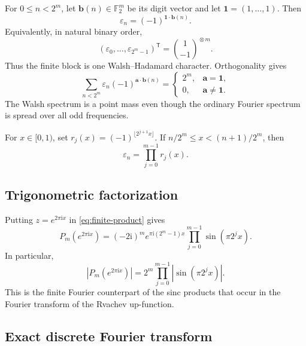 \documentclass[11pt,oneside]{article}
\numberwithin{equation}{section}
\theoremstyle{definition}
\theoremstyle{remark}
\newcommand{\F}{\mathbb F}
\newcommand{\eps}{\varepsilon}
\newcommand{\ii}{\mathrm i}
\begin{document}
For \(0\le n<2^m\), let \(\bm b(n)\in\F_2^m\) be its digit vector and let
\(\bm1=(1,\ldots,1)\).  Then
\begin{equation}
 \eps_n=(-1)^{\bm1\cdot\bm b(n)}.
 \label{eq:walsh-character}
\end{equation}
Equivalently, in natural binary order,
\begin{equation}
 (\eps_0,\ldots,\eps_{2^m-1})^{\mathsf T}
 =\binom{1}{-1}^{\!\otimes m}.
 \label{eq:kronecker}
\end{equation}
Thus the finite block is one Walsh--Hadamard character.  Orthogonality gives
\begin{equation}
 \boxed{\sum_{n<2^m}\eps_n(-1)^{\bm a\cdot\bm b(n)}
 =\begin{cases}2^m,&\bm a=\bm1,\\0,&\bm a\ne\bm1.
 \end{cases}}
 \label{eq:walsh-transform}
\end{equation}
The Walsh spectrum is a point mass even though the ordinary Fourier spectrum
is spread over all odd frequencies.

For \(x\in[0,1)\), set
\(r_j(x)=(-1)^{\lfloor2^{j+1}x\rfloor}\).  If
\(n/2^m\le x<(n+1)/2^m\), then
\begin{equation}
 \eps_n=\prod_{j=0}^{m-1}r_j(x).
 \label{eq:rademacher-product}
\end{equation}

\subsection{Trigonometric factorization}

Putting \(z=e^{2\pi\ii x}\) in \eqref{eq:finite-product} gives
\begin{equation}
 \boxed{P_m(e^{2\pi\ii x})
 =(-2\ii)^m e^{\pi\ii(2^m-1)x}
 \prod_{j=0}^{m-1}\sin(\pi2^jx).}
 \label{eq:trig-factorization}
\end{equation}
In particular,
\begin{equation}
 |P_m(e^{2\pi\ii x})|
 =2^m\prod_{j=0}^{m-1}|\sin(\pi2^jx)|.
 \label{eq:trig-modulus}
\end{equation}
This is the finite Fourier counterpart of the sinc products that occur in the
Fourier transform of the Rvachev up-function.

\subsection{Exact discrete Fourier transform}
\end{document}
